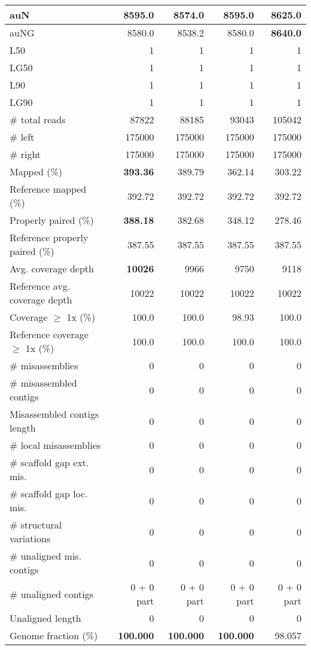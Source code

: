 \documentclass[12pt,a4paper]{article}
\begin{document}
\begin{table}[ht]
\begin{center}
\begin{tabular}{|l*{4}{|r}|}
auN & 8595.0 & 8574.0 & 8595.0 & {\bf 8625.0} \\ \hline
auNG & 8580.0 & 8538.2 & 8580.0 & {\bf 8640.0} \\ \hline
L50 & 1 & 1 & 1 & 1 \\ \hline
LG50 & 1 & 1 & 1 & 1 \\ \hline
L90 & 1 & 1 & 1 & 1 \\ \hline
LG90 & 1 & 1 & 1 & 1 \\ \hline
\# total reads & 87822 & 88185 & 93043 & 105042 \\ \hline
\# left & 175000 & 175000 & 175000 & 175000 \\ \hline
\# right & 175000 & 175000 & 175000 & 175000 \\ \hline
Mapped (\%) & {\bf 393.36} & 389.79 & 362.14 & 303.22 \\ \hline
Reference mapped (\%) & 392.72 & 392.72 & 392.72 & 392.72 \\ \hline
Properly paired (\%) & {\bf 388.18} & 382.68 & 348.12 & 278.46 \\ \hline
Reference properly paired (\%) & 387.55 & 387.55 & 387.55 & 387.55 \\ \hline
Avg. coverage depth & {\bf 10026} & 9966 & 9750 & 9118 \\ \hline
Reference avg. coverage depth & 10022 & 10022 & 10022 & 10022 \\ \hline
Coverage $\geq$ 1x (\%) & 100.0 & 100.0 & 98.93 & 100.0 \\ \hline
Reference coverage $\geq$ 1x (\%) & 100.0 & 100.0 & 100.0 & 100.0 \\ \hline
\# misassemblies & 0 & 0 & 0 & 0 \\ \hline
\# misassembled contigs & 0 & 0 & 0 & 0 \\ \hline
Misassembled contigs length & 0 & 0 & 0 & 0 \\ \hline
\# local misassemblies & 0 & 0 & 0 & 0 \\ \hline
\# scaffold gap ext. mis. & 0 & 0 & 0 & 0 \\ \hline
\# scaffold gap loc. mis. & 0 & 0 & 0 & 0 \\ \hline
\# structural variations & 0 & 0 & 0 & 0 \\ \hline
\# unaligned mis. contigs & 0 & 0 & 0 & 0 \\ \hline
\# unaligned contigs & 0 + 0 part & 0 + 0 part & 0 + 0 part & 0 + 0 part \\ \hline
Unaligned length & 0 & 0 & 0 & 0 \\ \hline
Genome fraction (\%) & {\bf 100.000} & {\bf 100.000} & {\bf 100.000} & 98.057 \\ \hline

\end{tabular}
\end{center}
\end{table}
\end{document}
